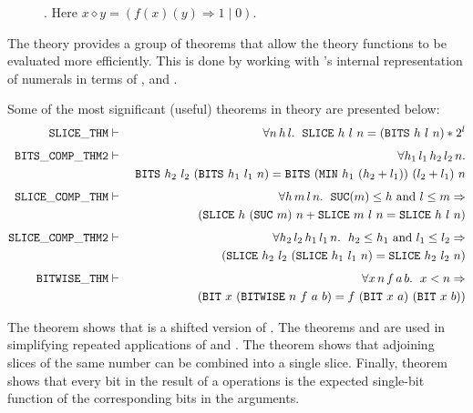 {\begin{figure}
\begin{center}

\end{center}
\caption{. Here $x\diamond y = (f(x)(y) \Rightarrow 1 \mid 0)$.\label{bitwise}}
\end{figure}

The  theory provides a group of theorems that allow
the  theory functions to be evaluated more efficiently.  This
is done by working with \HOL's internal representation of numerals
\ie{} in terms of ,  and .

Some of the most significant (useful) theorems in  theory are presented below:\begin{eqnarray*}
\mathtt{SLICE\_THM} & \vdash & \forall n\,h\,l.\ \;\slice\ h\ l\ n = (\bits\ h\ l\ n) * 2^l \\[4pt]
\mathtt{BITS\_COMP\_THM2} & \vdash & \forall h_1\,l_1\,h_2\,l_2\,n.\\*
&& \ \bits\ h_2\ l_2\ (\bits\ h_1\ l_1\ n) = \bits\ (\minn\ h_1\ (h_2 + l_1))\ (l_2 + l_1)\ n \\[4pt]\mathtt{SLICE\_COMP\_THM} & \vdash &
   \forall h\,m\,l\,n.\ \;\suc(m) \leq h \mbox{ and } l \leq m \Rightarrow \\*
&& \quad (\slice\ h\ (\suc\ m)\ n + \slice\ m\ l\ n = \slice\ h\ l\ n) \\[4pt]
\mathtt{SLICE\_COMP\_THM2} & \vdash &
   \forall h_2\,l_2\,h_1\,l_1\,n.\ \; h_2 \leq h_1 \mbox{ and } l_1 \leq l_2 \Rightarrow \\*&& \quad (\slice\ h_2\ l_2\ (\slice\ h_1\ l_1\ n) = \slice\ h_2\ l_2\ n) \\[4pt]
\mathtt{BITWISE\_THM} & \vdash &   \forall x\,n\,f\,a\,b.\ \;
        x < n \Rightarrow \\*
&& \quad (\bit\ x\ (\bitwise\ n\ f\ a\ b) = f\ (\bit\ x\ a)\ (\bit\ x\ b))
\end{eqnarray*}

\noindent
The theorem  shows that  is a shifted version
of .  The theorems  and
 are used in simplifying repeated applications
of  and .  The theorem  shows
that adjoining slices of the same number can be combined into a single
slice.  Finally, theorem  shows that every bit in the
result of a  operations is the expected single-bit
function of the corresponding bits in the arguments.

}

